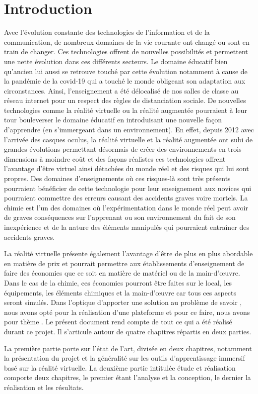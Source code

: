 \chapter*{Introduction}         %

Avec l’évolution constante des technologies de l’information et de la communication, de nombreux domaines de la vie courante ont changé ou sont en train de changer. 
Ces technologies offrent de nouvelles possibilités et permettent une nette évolution dans ces différents secteurs. 
Le domaine éducatif bien qu’ancien lui aussi se retrouve touché par cette évolution notamment à cause de la pandémie de la covid-19 qui a touché le monde obligeant son adaptation aux circonstances. 
Ainsi, l’enseignement a été délocalisé de nos salles de classe au réseau internet pour un respect des règles de distanciation sociale. 
De nouvelles technologies comme la réalité virtuelle ou la réalité augmentée pourraient à leur tour bouleverser le domaine éducatif en introduisant une nouvelle façon d’apprendre (en s’immergeant dans un environnement). 
En effet, depuis 2012 avec l’arrivée des casques oculus, la réalité virtuelle et la réalité augmentée ont subi de grandes évolutions permettant désormais de créer des environnements en trois dimensions à moindre coût et des façons réalistes ces technologies offrent l’avantage d’être virtuel ainsi détachées du monde réel et des risques qui lui sont propres. 
Des domaines d’enseignements où ces risques-là sont très présents pourraient bénéficier de cette technologie pour leur enseignement aux novices qui pourraient commettre des erreurs causant des accidents graves voire mortels. 
La chimie est l’un des domaines où l’expérimentation dans le monde réel peut avoir de graves conséquences sur l’apprenant ou son environnement du fait de son inexpérience et de la nature des éléments manipulés qui pourraient entraîner des accidents graves.

La réalité virtuelle présente également l'avantage d'être de plus en plus abordable en matière de prix et pourrait permettre aux établissements d'enseignement de faire des économies que ce soit en matière de matériel ou de la main-d'œuvre.
Dans le cas de la chimie, ces économies pourront être faites sur le local, les équipements, les éléments chimiques et la main-d'œuvre car tous ces aspects seront simulés.
Dans l'optique d'apporter une solution au problème de savoir \og \pb \fg, nous avons opté pour la réalisation d'une plateforme et pour ce faire, nous avons pour thème \og \theme \fg.
Le présent document rend compte de tout ce qui a été réalisé durant ce projet. Il s’articule autour de quatre chapitres répartis en deux parties.

La première partie porte sur l’état de l’art, divisée en deux chapitres, notamment la présentation du projet et la généralité sur les outils d'apprentissage immersif basé sur la réalité virtuelle.
La deuxième partie intitulée étude et réalisation comporte deux chapitres, le premier étant l’analyse et la conception, le dernier la réalisation et les résultats.

